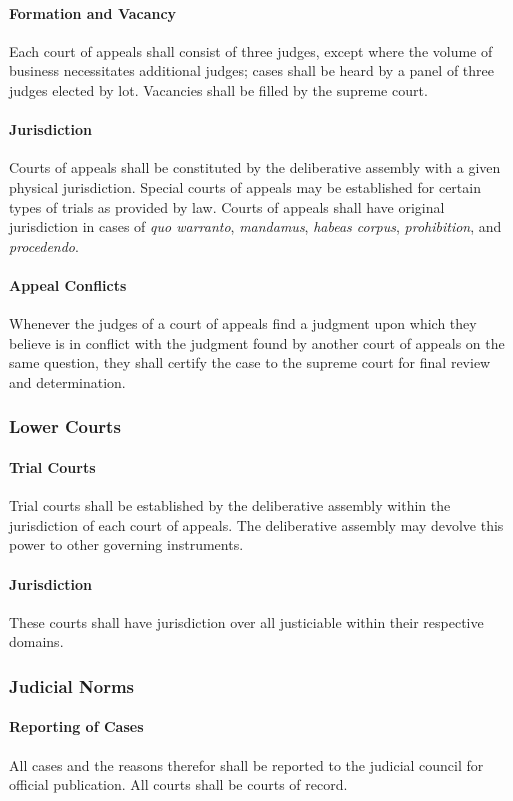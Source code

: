 \documentclass{article}
\begin{document}
\paragraph{Formation and Vacancy}
Each court of appeals shall consist of three judges, except where the volume of business necessitates additional judges; cases shall be heard by a panel of three judges elected by lot. Vacancies shall be filled by the supreme court.
\paragraph{Jurisdiction}
Courts of appeals shall be constituted by the deliberative assembly with a given physical jurisdiction. Special courts of appeals may be established for certain types of trials as provided by law. Courts of appeals shall have original jurisdiction in cases of \textit{quo warranto}, \textit{mandamus}, \textit{habeas corpus}, \textit{prohibition}, and \textit{procedendo}.
\paragraph{Appeal Conflicts}
Whenever the judges of a court of appeals find a judgment upon which they believe is in conflict with the judgment found by another court of appeals on the same question, they shall certify the case to the supreme court for final review and determination. 
\subsubsection{Lower Courts}
\paragraph{Trial Courts}
Trial courts shall be established by the deliberative assembly within the jurisdiction of each court of appeals. The deliberative assembly may devolve this power to other governing instruments.
\paragraph{Jurisdiction}
These courts shall have jurisdiction over all justiciable within their respective domains.
\subsubsection{Judicial Norms}
\paragraph{Reporting of Cases}
All cases and the reasons therefor shall be reported to the judicial council for official publication. All courts shall be courts of record.
\end{document}

